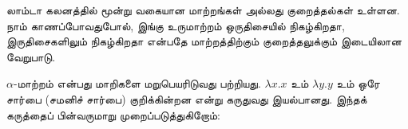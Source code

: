 \documentclass[../../../include/open-logic-section]{subfiles}
\begin{document}

லாம்டா கலனத்தில் மூன்று வகையான மாற்றங்கள் அல்லது குறைத்தல்கள் உள்ளன.
நாம் காணப்போவதுபோல், இங்கு உருமாற்றம் ஒருதிசையில் நிகழ்கிறதா,
இருதிசைகளிலும் நிகழ்கிறதா என்பதே மாற்றத்திற்கும் குறைத்தலுக்கும்
இடையிலான வேறுபாடு.

$\alpha$-மாற்றம் என்பது மாறிகளை மறுபெயரிடுவது பற்றியது.
$\lambda x. x$ உம் $\lambda y.y$ உம் ஒரே சார்பை
(சமனிச் சார்பை) குறிக்கின்றன என்று கருதுவது இயல்பானது.
இந்தக் கருத்தைப் பின்வருமாறு முறைப்படுத்துகிறோம்:

\end{document}
